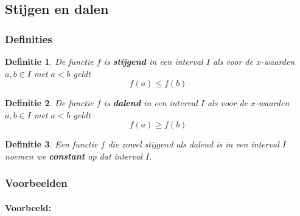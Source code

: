 \documentclass[12pt,twoside]{article}
\newtheorem{definition}{Definitie}
\begin{document}
\begin{theorie}

\subsection{Stijgen en dalen}

\subsubsection*{Definities}

\begin{definition}
  De functie $f$ is {\bf stijgend} in een interval $I$ als voor de $x$-waarden $a,b\in I$ met $a<b$ geldt
  $$f(a)\leq f(b)$$
\end{definition}

\begin{definition}
  De functie $f$ is {\bf dalend} in een interval $I$ als voor de $x$-waarden $a,b\in I$ met $a<b$ geldt
  $$f(a)\geq f(b)$$
\end{definition}

\begin{definition}
  Een functie $f$ die zowel stijgend als dalend is in een interval $I$ noemen we {\bf constant} op dat interval $I$.
\end{definition}

\subsubsection*{Voorbeelden}

\paragraph{Voorbeeld:}\mbox{}


\end{theorie}
\end{document}
